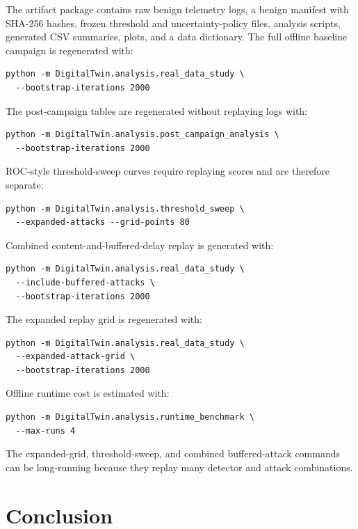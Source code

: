 \documentclass[conference]{IEEEtran}
\begin{document}
The artifact package contains raw benign telemetry logs, a benign manifest
with SHA-256 hashes, frozen threshold and uncertainty-policy files, analysis
scripts, generated CSV summaries, plots, and a data dictionary. The full
offline baseline campaign is regenerated with:
\begin{verbatim}
python -m DigitalTwin.analysis.real_data_study \
  --bootstrap-iterations 2000
\end{verbatim}
The post-campaign tables are regenerated without replaying logs with:
\begin{verbatim}
python -m DigitalTwin.analysis.post_campaign_analysis \
  --bootstrap-iterations 2000
\end{verbatim}
ROC-style threshold-sweep curves require replaying scores and are therefore
separate:
\begin{verbatim}
python -m DigitalTwin.analysis.threshold_sweep \
  --expanded-attacks --grid-points 80
\end{verbatim}
Combined content-and-buffered-delay replay is generated with:
\begin{verbatim}
python -m DigitalTwin.analysis.real_data_study \
  --include-buffered-attacks \
  --bootstrap-iterations 2000
\end{verbatim}
The expanded replay grid is regenerated with:
\begin{verbatim}
python -m DigitalTwin.analysis.real_data_study \
  --expanded-attack-grid \
  --bootstrap-iterations 2000
\end{verbatim}
Offline runtime cost is estimated with:
\begin{verbatim}
python -m DigitalTwin.analysis.runtime_benchmark \
  --max-runs 4
\end{verbatim}
The expanded-grid, threshold-sweep, and combined buffered-attack commands can be long-running
because they replay many detector and attack combinations.

\section{Conclusion}
\end{document}

